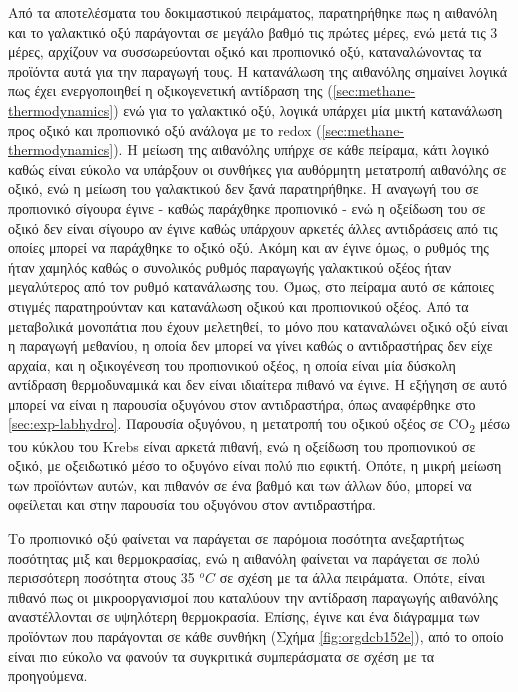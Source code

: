 \documentclass[11pt]{report}
\begin{document}
Από τα αποτελέσματα του δοκιμαστικού πειράματος, παρατηρήθηκε πως η αιθανόλη και το γαλακτικό οξύ παράγονται σε μεγάλο βαθμό τις πρώτες μέρες, ενώ μετά τις 3 μέρες, αρχίζουν να συσσωρεύονται οξικό και προπιονικό οξύ, καταναλώνοντας τα προϊόντα αυτά για την παραγωγή τους. Η κατανάλωση της αιθανόλης σημαίνει λογικά πως έχει ενεργοποιηθεί η οξικογενετική αντίδραση της (\autoref{sec:methane-thermodynamics}) ενώ για το γαλακτικό οξύ, λογικά υπάρχει μία μικτή κατανάλωση προς οξικό και προπιονικό οξύ ανάλογα με το \acrshort{redox} (\autoref{sec:methane-thermodynamics}). Η μείωση της αιθανόλης υπήρχε σε κάθε πείραμα, κάτι λογικό καθώς είναι εύκολο να υπάρξουν οι συνθήκες για αυθόρμητη μετατροπή αιθανόλης σε οξικό, ενώ η μείωση του γαλακτικού δεν ξανά παρατηρήθηκε. Η αναγωγή του σε προπιονικό σίγουρα έγινε - καθώς παράχθηκε προπιονικό - ενώ η οξείδωση του σε οξικό δεν είναι σίγουρο αν έγινε καθώς υπάρχουν αρκετές άλλες αντιδράσεις από τις οποίες μπορεί να παράχθηκε το οξικό οξύ. Ακόμη και αν έγινε όμως, ο ρυθμός της ήταν χαμηλός καθώς ο συνολικός ρυθμός παραγωγής γαλακτικού οξέος ήταν μεγαλύτερος από τον ρυθμό κατανάλωσης του. Όμως, στο πείραμα αυτό σε κάποιες στιγμές παρατηρούνταν και κατανάλωση οξικού και προπιονικού οξέος. Από τα μεταβολικά μονοπάτια που έχουν μελετηθεί, το μόνο που καταναλώνει οξικό οξύ είναι η παραγωγή μεθανίου, η οποία δεν μπορεί να γίνει καθώς ο αντιδραστήρας δεν είχε αρχαία, και η οξικογένεση του προπιονικού οξέος, η οποία είναι μία δύσκολη αντίδραση θερμοδυναμικά και δεν είναι ιδιαίτερα πιθανό να έγινε. Η εξήγηση σε αυτό μπορεί να είναι η παρουσία οξυγόνου στον αντιδραστήρα, όπως αναφέρθηκε στο \autoref{sec:exp-labhydro}. Παρουσία οξυγόνου, η μετατροπή του οξικού οξέος σε CO\textsubscript{2} μέσω του κύκλου του Krebs είναι αρκετά πιθανή, ενώ η οξείδωση του προπιονικού σε οξικό, με οξειδωτικό μέσο το οξυγόνο είναι πολύ πιο εφικτή. Οπότε, η μικρή μείωση των προϊόντων αυτών, και πιθανόν σε ένα βαθμό και των άλλων δύο, μπορεί να οφείλεται και στην παρουσία του οξυγόνου στον αντιδραστήρα.

Το προπιονικό οξύ φαίνεται να παράγεται σε παρόμοια ποσότητα ανεξαρτήτως ποσότητας μιξ και θερμοκρασίας, ενώ η αιθανόλη φαίνεται να παράγεται σε πολύ περισσότερη ποσότητα στους 35 \(^oC\) σε σχέση με τα άλλα πειράματα. Οπότε, είναι πιθανό πως οι μικροοργανισμοί που καταλύουν την αντίδραση παραγωγής αιθανόλης αναστέλλονται σε υψηλότερη θερμοκρασία. Επίσης, έγινε και ένα διάγραμμα των προϊόντων που παράγονται σε κάθε συνθήκη (Σχήμα \ref{fig:orgdcb152e}), από το οποίο είναι πιο εύκολο να φανούν τα συγκριτικά συμπεράσματα σε σχέση με τα προηγούμενα.
\end{document}
